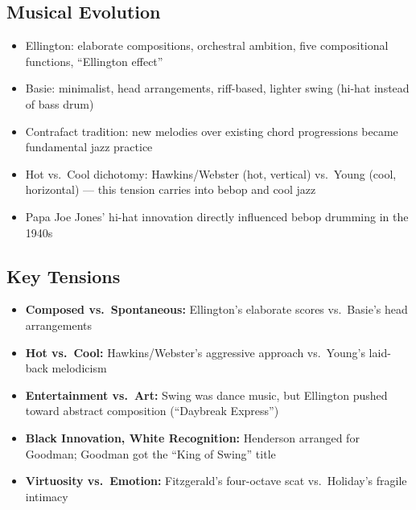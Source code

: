 \documentclass[11pt, letterpaper]{article}
\begin{document}
\subsection{Musical Evolution}
\begin{itemize}
    \item Ellington: elaborate compositions, orchestral ambition, five compositional functions, ``Ellington effect''
    \item Basie: minimalist, head arrangements, riff-based, lighter swing (hi-hat instead of bass drum)
    \item Contrafact tradition: new melodies over existing chord progressions became fundamental jazz practice
    \item Hot vs.\ Cool dichotomy: Hawkins/Webster (hot, vertical) vs.\ Young (cool, horizontal) --- this tension carries into bebop and cool jazz
    \item Papa Joe Jones' hi-hat innovation directly influenced bebop drumming in the 1940s
\end{itemize}

\subsection{Key Tensions}
\begin{itemize}
    \item \textbf{Composed vs.\ Spontaneous:} Ellington's elaborate scores vs.\ Basie's head arrangements
    \item \textbf{Hot vs.\ Cool:} Hawkins/Webster's aggressive approach vs.\ Young's laid-back melodicism
    \item \textbf{Entertainment vs.\ Art:} Swing was dance music, but Ellington pushed toward abstract composition (``Daybreak Express'')
    \item \textbf{Black Innovation, White Recognition:} Henderson arranged for Goodman; Goodman got the ``King of Swing'' title
    \item \textbf{Virtuosity vs.\ Emotion:} Fitzgerald's four-octave scat vs.\ Holiday's fragile intimacy
\end{itemize}
\end{document}
